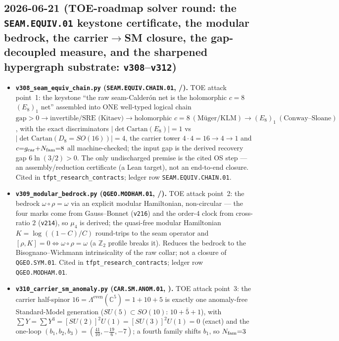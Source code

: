\subsection*{2026-06-21 (TOE-roadmap solver round: the \texttt{SEAM.EQUIV.01} keystone certificate, the modular bedrock, the carrier$\to$SM closure, the gap-decoupled measure, and the sharpened hypergraph substrate: \texttt{v308}--\texttt{v312})}
\begin{itemize}
\item \textbf{\texttt{v308\_seam\_equiv\_chain.py} (\texttt{SEAM.EQUIV.CHAIN.01}, \mE/\mO).} TOE attack point~1:
  the keystone ``the raw seam-Calder\'on net is the holomorphic $c{=}8$ $(E_8)_1$ net'' assembled into ONE
  well-typed logical chain $\text{gap}{>}0\to\text{invertible/SRE (Kitaev)}\to\text{holomorphic }c{=}8\
  (\text{M\"uger/KLM})\to(E_8)_1\ (\text{Conway--Sloane})$, with the exact discriminators
  $|\det\mathrm{Cartan}(E_8)|{=}1$ vs $|\det\mathrm{Cartan}(D_8{=}SO(16))|{=}4$, the carrier tower
  $4{\cdot}4{=}16\to4\to1$ and $c{=}g_{\mathrm{car}}{+}N_{\mathrm{fam}}{=}8$ all machine-checked; the input gap is the derived recovery gap
  $6\ln(3/2){>}0$. The only undischarged premise is the cited OS step --- an assembly/reduction certificate (a Lean
  target), not an end-to-end closure. Cited in \texttt{tfpt\_research\_contracts}; ledger row \texttt{SEAM.EQUIV.CHAIN.01}.
\item \textbf{\texttt{v309\_modular\_bedrock.py} (\texttt{QGEO.MODHAM.01}, \mE/\mO).} TOE attack point~2: the bedrock
  $\omega{\circ}\rho{=}\omega$ via an explicit modular Hamiltonian, non-circular --- the four marks come from
  Gauss--Bonnet (\texttt{v216}) and the order-$4$ clock from cross-ratio $2$ (\texttt{v214}), so $\mu_4$ is derived;
  the quasi-free modular Hamiltonian $K=\log((1{-}C)/C)$ round-trips to the seam operator and $[\rho,K]{=}0
  \Leftrightarrow\omega{\circ}\rho{=}\omega$ (a $\mathbb Z_2$ profile breaks it). Reduces the bedrock to the
  Bisognano--Wichmann intrinsicality of the raw collar; not a closure of \texttt{QGEO.SYM.01}. Cited in
  \texttt{tfpt\_research\_contracts}; ledger row \texttt{QGEO.MODHAM.01}.
\item \textbf{\texttt{v310\_carrier\_sm\_anomaly.py} (\texttt{CAR.SM.ANOM.01}, \mE).} TOE attack point~3: the carrier
  half-spinor $16=\Lambda^{\mathrm{even}}(\mathbb C^5)=1{+}10{+}5$ is exactly one anomaly-free Standard-Model
  generation ($SU(5)\subset SO(10)$: $10{+}\bar5{+}1$), with $\sum Y=\sum Y^3=[SU(2)]^2U(1)=[SU(3)]^2U(1)=0$ (exact)
  and the one-loop $(b_1,b_2,b_3)=(\tfrac{41}{10},-\tfrac{19}{6},-7)$; a fourth family shifts $b_1$, so $N_{\mathrm{fam}}{=}3$

\end{itemize}
